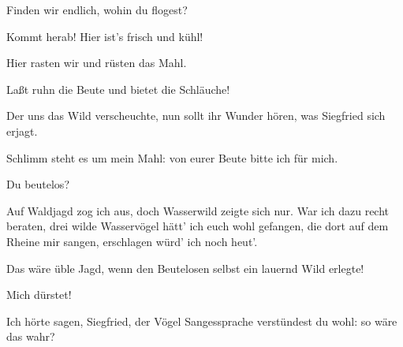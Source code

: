 \begin{drama}
\Hagenspeaks



Finden wir endlich,
wohin du flogest?
 

\Siegfriedspeaks

Kommt herab! Hier ist's frisch und kühl!
 




\Hagenspeaks

Hier rasten wir und rüsten das Mahl.


Laßt ruhn die Beute und bietet die Schläuche!


Der uns das Wild verscheuchte,
nun sollt ihr Wunder hören,
was Siegfried sich erjagt.
 

\Siegfriedspeaks



Schlimm steht es um mein Mahl:
von eurer Beute bitte ich für mich.
 

\Hagenspeaks

Du beutelos?
 

\Siegfriedspeaks

Auf Waldjagd zog ich aus,
doch Wasserwild zeigte sich nur.
War ich dazu recht beraten,
drei wilde Wasservögel
hätt' ich euch wohl gefangen,
die dort auf dem Rheine mir sangen,
erschlagen würd' ich noch heut'.
 






\Hagenspeaks

Das wäre üble Jagd,
wenn den Beutelosen selbst
ein lauernd Wild erlegte!
 

\Siegfriedspeaks

Mich dürstet!
 

\Hagenspeaks



Ich hörte sagen, Siegfried,
der Vögel Sangessprache
verstündest du wohl:
so wäre das wahr?
 

\Siegfriedspeaks


\end{drama}
